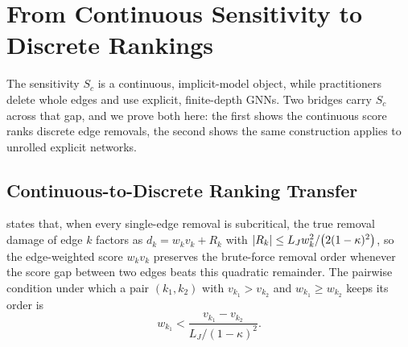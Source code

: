 \section{From Continuous Sensitivity to Discrete Rankings}
\label{app:transfer}

The sensitivity $S_c$ is a continuous, implicit-model object, while practitioners delete whole edges and
use explicit, finite-depth GNNs. Two bridges carry $S_c$ across that gap, and we prove both here: the
first shows the continuous score ranks discrete edge removals, the second shows the same construction
applies to unrolled explicit networks.

\subsection{Continuous-to-Discrete Ranking Transfer}
\label{app:proof_transfer}

 states that, when every single-edge removal is subcritical, the true removal damage
of edge $k$ factors as $d_k=w_k v_k+R_k$ with $\left|R_k\right|\le L_J w_k^2/\big(2(1-\kappa)^2\big)$, so the
edge-weighted score $w_k v_k$ preserves the brute-force removal order whenever the score gap between two
edges beats this quadratic remainder. The pairwise condition under which a pair $(k_1,k_2)$ with
$v_{k_1}>v_{k_2}$ and $w_{k_1}\ge w_{k_2}$ keeps its order is
\begin{equation}
w_{k_1}<\frac{v_{k_1}-v_{k_2}}{L_J/(1-\kappa)^2}.
\label{eq:ranking}
\end{equation}


